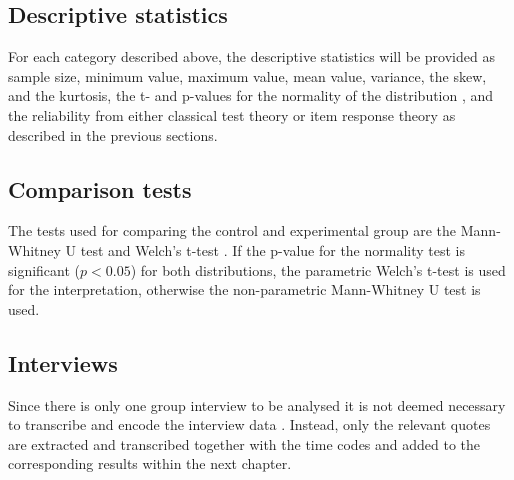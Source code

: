 \subsection{Descriptive statistics}

For each category described above, the descriptive statistics will be provided as sample size, minimum value, maximum value, mean value, variance, the skew, and the kurtosis, the t- and p-values for the normality of the distribution \cite{normality}, and the reliability from either classical test theory or item response theory as described in the previous sections.

\subsection{Comparison tests}

The tests used for comparing the control and experimental group are the Mann-Whitney U \cite{mannwhitneyu} test and Welch's t-test \cite{welch}. If the p-value for the normality test is significant ($p<0.05$) for both distributions, the parametric Welch's t-test is used for the interpretation, otherwise the non-parametric Mann-Whitney U test is used.

\subsection{Interviews}

Since there is only one group interview to be analysed it is not deemed necessary to transcribe and encode the interview data \cite{baarda}. Instead, only the relevant quotes are extracted and transcribed together with the time codes and added to the corresponding results within the next chapter.
